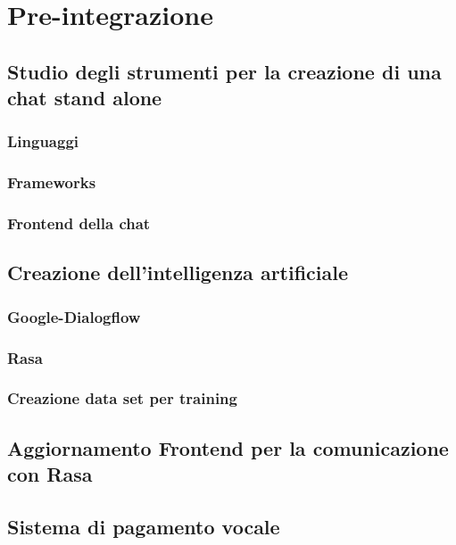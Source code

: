\chapter{Pre-integrazione}

\section{Studio degli strumenti per la creazione di una chat stand alone}

\subsection{Linguaggi}

\subsection{Frameworks}

\subsection{Frontend della chat}

\section{Creazione dell'intelligenza artificiale}

\subsection{Google-Dialogflow}

\subsection{Rasa}

\subsection{Creazione data set per training}

\section{Aggiornamento Frontend per la comunicazione con Rasa}

\section{Sistema di pagamento vocale}

